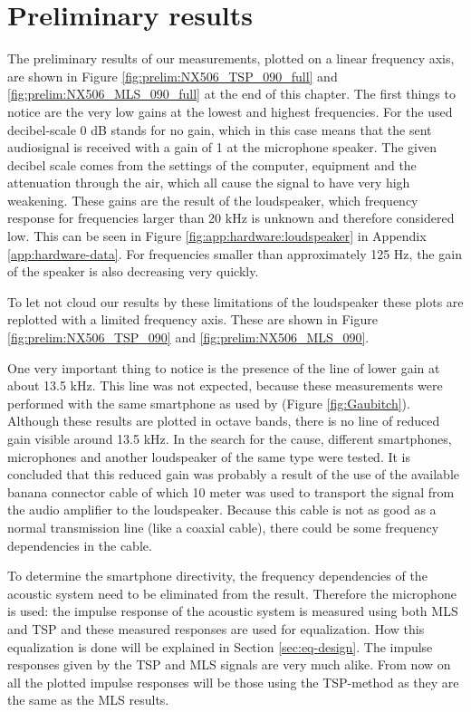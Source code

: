 \section{Preliminary results}
\label{sec:prelim_res}
The preliminary results of our measurements, plotted on a linear frequency axis, are shown in Figure \ref{fig:prelim:NX506_TSP_090_full} and \ref{fig:prelim:NX506_MLS_090_full} at the end of this chapter.
The first things to notice are the very low gains at the lowest and highest frequencies.
For the used decibel-scale 0 dB stands for no gain, which in this case means that the sent audiosignal is received with a gain of 1 at the microphone speaker.
The given decibel scale comes from the settings of the computer, equipment and the attenuation through the air, which all cause the signal to have very high weakening. 
These gains are the result of the loudspeaker, which frequency response for frequencies larger than 20 kHz is unknown \cite{manual:loudspeaker} and therefore considered low.
This can be seen in Figure \ref{fig:app:hardware:loudspeaker} in Appendix \ref{app:hardware-data}.
For frequencies smaller than approximately 125 Hz, the gain of the speaker is also decreasing very quickly.

To let not cloud our results by these limitations of the loudspeaker these plots are replotted with a limited frequency axis.
These are shown in Figure \ref{fig:prelim:NX506_TSP_090} and \ref{fig:prelim:NX506_MLS_090}.

One very important thing to notice is the presence of the line of lower gain at about 13.5 kHz.
This line was not expected, because these measurements were performed with the same smartphone as used by \cite{Gaubitch2014} (Figure \ref{fig:Gaubitch}).
Although these results are plotted in octave bands, there is no line of reduced gain visible around 13.5 kHz.
In the search for the cause, different smartphones, microphones and another loudspeaker of the same type \cite{manual:loudspeaker} were tested.
It is concluded that this reduced gain was probably a result of the use of the available banana connector cable of which 10 meter was used to transport the signal from the audio amplifier to the loudspeaker.
Because this cable is not as good as a normal transmission line (like a coaxial cable), there could be some frequency dependencies in the cable.

To determine the smartphone directivity, the frequency dependencies of the acoustic system need to be eliminated from the result.
Therefore the microphone \cite{manual:microphone} is used: the impulse response of the acoustic system is measured using both MLS and TSP and these measured responses are used for equalization.
How this equalization is done will be explained in Section \ref{sec:eq-design}.
The impulse responses given by the TSP and MLS signals are very much alike.
From now on all the plotted impulse responses will be those using the TSP-method as they are the same as the MLS results.

